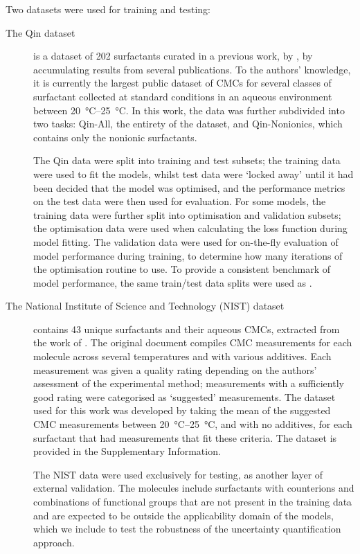 \newcommand{\lrv}{\vec{v}^{\,(p)}}

Two datasets were used for training and testing:

\begin{description}
    \item[The Qin dataset] is a dataset of 202 surfactants curated in a
        previous work, by \citet{qinPredictingCriticalMicelle2021}, by
        accumulating results from several publications. To the authors'
        knowledge, it is currently the largest public dataset of CMCs for
        several classes of surfactant collected at standard conditions in an
        aqueous environment between \SIrange{20}{25}{\celsius}. In this work,
        the data was further subdivided into two tasks: Qin-All, the entirety of
        the dataset, and Qin-Nonionics, which contains only the nonionic
        surfactants.

        The Qin data were split into training and test subsets; the training
        data were used to fit the models, whilst test data were `locked away'
        until it had been decided that the model was optimised, and the
        performance metrics on the test data were then used for evaluation. For
        some models, the training data were further split into optimisation and
        validation subsets; the optimisation data were used when calculating the
        loss function during model fitting. The validation data were used for
        on-the-fly evaluation of model performance during training, to determine
        how many iterations of the optimisation routine to use. To provide a
        consistent benchmark of model performance, the same train/test data
        splits were used as \citet{qinPredictingCriticalMicelle2021}.

    \item[The National Institute of Science and Technology (NIST) dataset]
        contains 43 unique surfactants and their aqueous CMCs, extracted from
        the work of \citet{mukerjeeCriticalMicelleConcentrations1971}. The
        original document compiles CMC measurements for each molecule across
        several temperatures and with various additives. Each measurement was
        given a quality rating depending on the authors' assessment of the
        experimental method; measurements with a sufficiently good rating were
        categorised as `suggested' measurements. The dataset used for this work
        was developed by taking the mean of the suggested CMC measurements
        between \SIrange{20}{25}{\degreeCelsius}, and with no additives, for
        each surfactant that had measurements that fit these criteria. The
        dataset is provided in the Supplementary Information.
        
        The NIST data were used exclusively for testing, as another layer of
        external validation. The molecules include surfactants with counterions
        and combinations of functional groups that are not present in the
        training data and are expected to be outside the applicability domain of
        the models, which we include to test the robustness of the uncertainty
        quantification approach.
\end{description}

